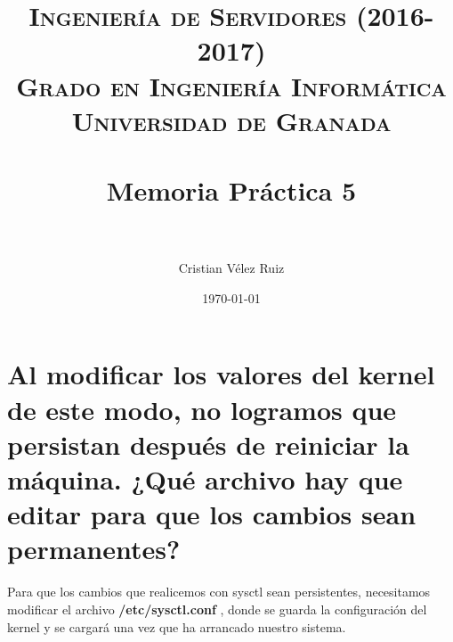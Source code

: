


\title{	
\normalfont \normalsize 
\textsc{\textbf{Ingeniería de Servidores (2016-2017)} \\ Grado en Ingeniería Informática \\ Universidad de Granada} \\ [25pt] %
\horrule{0.5pt} \\[0.4cm] %
\huge Memoria Práctica 5 \\ %
\horrule{2pt} \\[0.5cm] %
}

\author{Cristian Vélez Ruiz} %

\date{\normalsize\today} %



\maketitle %

\newpage %

\tableofcontents %

\listoffigures

\listoftables

\newpage

\section[Cuestión 1]{Al modificar los valores del kernel de este modo, no logramos que persistan después de reiniciar la máquina. ¿Qué archivo hay que editar para que los cambios sean permanentes?}

Para que los cambios que realicemos con sysctl sean persistentes, necesitamos modificar el archivo \textbf{/etc/sysctl.conf} \cite{kernel}, donde se guarda la configuración del kernel y se cargará una vez que ha arrancado nuestro sistema.

